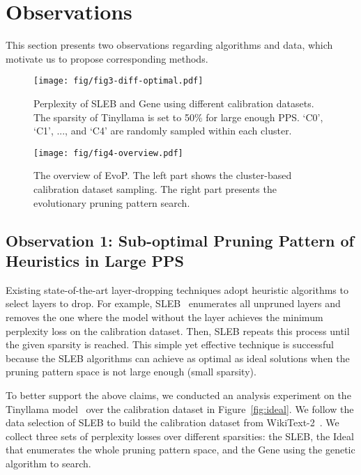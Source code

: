 \section{Observations}

This section presents two observations regarding algorithms and data, which motivate us to propose corresponding methods.

\begin{figure}[t]
\centering
\texttt{[image: fig/fig3-diff-optimal.pdf]}
\caption{Perplexity of SLEB and Gene using different calibration datasets. The sparsity of Tinyllama is set to 50\% for large enough PPS. %
`C0', `C1', ..., and `C4' are randomly sampled within each cluster.}
\label{fig:diff-optimal}
\end{figure}

\begin{figure*}[t]
\centering
\texttt{[image: fig/fig4-overview.pdf]}
\caption{The overview of EvoP. The left part shows the cluster-based calibration dataset sampling. The right part presents the evolutionary pruning pattern search.}
\label{fig:overview}
\end{figure*}

\subsection{Observation 1: Sub-optimal Pruning Pattern of Heuristics in Large PPS}

Existing state-of-the-art layer-dropping techniques adopt heuristic algorithms to select layers to drop.
For example, SLEB~\cite{sleb} enumerates all unpruned layers and removes the one where the model without the layer achieves the minimum perplexity loss on the calibration dataset.
Then, SLEB repeats this process until the given sparsity is reached.
This simple yet effective technique is successful because the SLEB algorithms can achieve as optimal as ideal solutions when the pruning pattern space is not large enough (small sparsity).

To better support the above claims, we conducted an analysis experiment on the Tinyllama model~\cite{tinyllama} over the calibration dataset in Figure~\ref{fig:ideal}.
We follow the data selection of SLEB to build the calibration dataset from WikiText-2~\cite{wikitext2}.
We collect three sets of perplexity losses over different sparsities: the SLEB, the Ideal that enumerates the whole pruning pattern space, and the Gene using the genetic algorithm to search.


